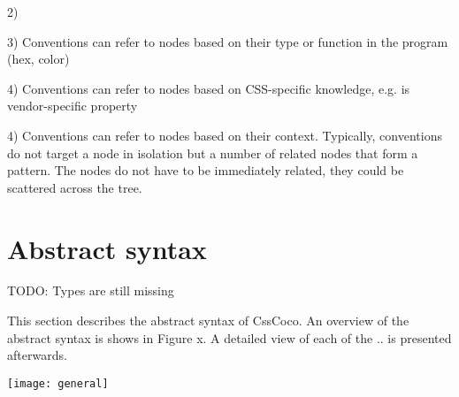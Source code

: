 \documentclass[parskip=full]{uvamscse}
\begin{document}
2) 

3) Conventions can refer to nodes based on their type or function in the program (hex, color)

4) Conventions can refer to nodes based on CSS-specific knowledge, e.g. is vendor-specific property

4) Conventions can refer to nodes based on their context. Typically, conventions do not target a
node in isolation but a number of related nodes that form a pattern. The nodes do not have to be
immediately related, they could be scattered across the tree.

\section{Abstract syntax}

TODO: Types are still missing

This section describes the abstract syntax of CssCoco. An overview of the abstract syntax is shows in Figure x. A detailed view of each of the .. is presented afterwards.

\texttt{[image: general]}
\end{document}
